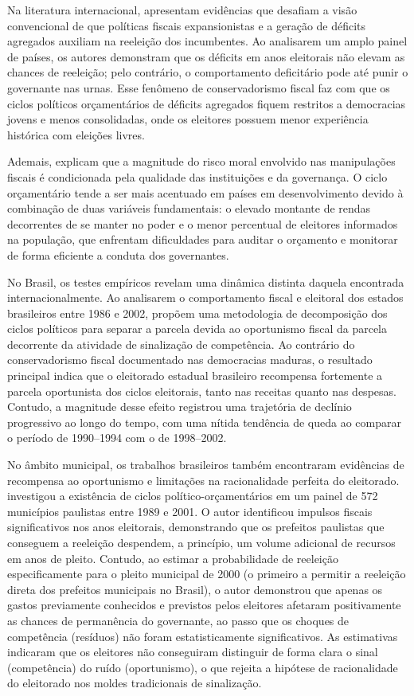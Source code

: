 Na literatura internacional, \textcite{brender2005, brender2008} apresentam evidências que desafiam a visão convencional de que políticas fiscais expansionistas e a geração de déficits agregados auxiliam na reeleição dos incumbentes. Ao analisarem um amplo painel de países, os autores demonstram que os déficits em anos eleitorais não elevam as chances de reeleição; pelo contrário, o comportamento deficitário pode até punir o governante nas urnas. Esse fenômeno de conservadorismo fiscal faz com que os ciclos políticos orçamentários de déficits agregados fiquem restritos a democracias jovens e menos consolidadas, onde os eleitores possuem menor experiência histórica com eleições livres.

Ademais, \textcite{shi2006} explicam que a magnitude do risco moral envolvido nas manipulações fiscais é condicionada pela qualidade das instituições e da governança. O ciclo orçamentário tende a ser mais acentuado em países em desenvolvimento devido à combinação de duas variáveis fundamentais: o elevado montante de rendas decorrentes de se manter no poder e o menor percentual de eleitores informados na população, que enfrentam dificuldades para auditar o orçamento e monitorar de forma eficiente a conduta dos governantes.

No Brasil, os testes empíricos revelam uma dinâmica distinta daquela encontrada internacionalmente. Ao analisarem o comportamento fiscal e eleitoral dos estados brasileiros entre 1986 e 2002, \textcite{nakaguma2010} propõem uma metodologia de decomposição dos ciclos políticos para separar a parcela devida ao oportunismo fiscal da parcela decorrente da atividade de sinalização de competência. Ao contrário do conservadorismo fiscal documentado nas democracias maduras, o resultado principal indica que o eleitorado estadual brasileiro recompensa fortemente a parcela oportunista dos ciclos eleitorais, tanto nas receitas quanto nas despesas. Contudo, a magnitude desse efeito registrou uma trajetória de declínio progressivo ao longo do tempo, com uma nítida tendência de queda ao comparar o período de 1990--1994 com o de 1998--2002.

No âmbito municipal, os trabalhos brasileiros também encontraram evidências de recompensa ao oportunismo e limitações na racionalidade perfeita do eleitorado. \textcite{sakurai2005} investigou a existência de ciclos político-orçamentários em um painel de 572 municípios paulistas entre 1989 e 2001. O autor identificou impulsos fiscais significativos nos anos eleitorais, demonstrando que os prefeitos paulistas que conseguem a reeleição despendem, a princípio, um volume adicional de recursos em anos de pleito. Contudo, ao estimar a probabilidade de reeleição especificamente para o pleito municipal de 2000 (o primeiro a permitir a reeleição direta dos prefeitos municipais no Brasil), o autor demonstrou que apenas os gastos previamente conhecidos e previstos pelos eleitores afetaram positivamente as chances de permanência do governante, ao passo que os choques de competência (resíduos) não foram estatisticamente significativos. As estimativas indicaram que os eleitores não conseguiram distinguir de forma clara o sinal (competência) do ruído (oportunismo), o que rejeita a hipótese de racionalidade do eleitorado nos moldes tradicionais de sinalização.

